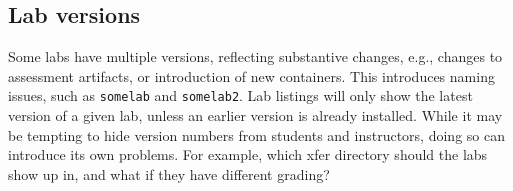 \documentclass[12pt]{article}
\begin{document}
\subsection{Lab versions}
Some labs have multiple versions, reflecting substantive changes, e.g., changes to assessment artifacts, or introduction of new containers.
This introduces naming issues, such as {\tt somelab} and {\tt somelab2}.  Lab listings will only show the latest version of a given lab, unless
an earlier version is already installed.  While it may be tempting to hide version numbers from students and instructors, doing so can introduce
its own problems.  For example, which xfer directory should the labs show up in, and what if they have different grading? 
\end{document}
